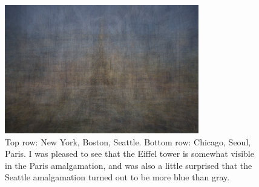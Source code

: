 \documentclass[letterpaper,12pt]{article}
\begin{document}
\begin{figure}
	\includegraphics[scale=0.4]{../Output/paris-amalgamation.png}
	\caption{Top row: New York, Boston, Seattle. Bottom row: Chicago, Seoul, Paris. I was pleased to see that the Eiffel tower is somewhat visible in the Paris amalgamation, and was also a little surprised that the Seattle amalgamation turned out to be more blue than gray.}
\end{figure}
\end{document}

